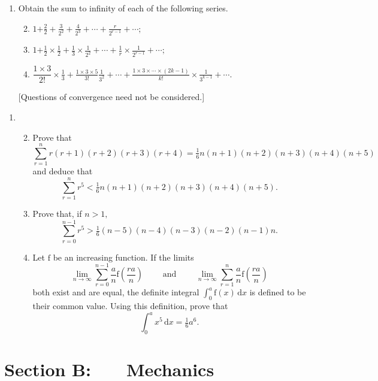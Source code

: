 \documentclass[a4, 11pt]{report}
\newlength{\qspace}
\newcounter{qnumber}
\newenvironment{question}%
 {\vspace{\qspace}
  \begin{enumerate}[\bfseries 1\quad][10]%
    \setcounter{enumi}{\value{qnumber}}%
    \item%
 }
{
  \end{enumerate}
  \filbreak
  \stepcounter{qnumber}
 }
\newenvironment{questionparts}[1][1]%
 {
  \begin{enumerate}[\bfseries (i)]%
    \setcounter{enumii}{#1}
    \addtocounter{enumii}{-1}
    \setlength{\itemsep}{5mm}
    \setlength{\parskip}{8pt}
 }
 {
  \end{enumerate}
 }
\begin{document}
		
		\begin{question}
Obtain the sum to infinity of each of the following series. 

\begin{questionparts}
\item $1{\displaystyle +\frac{2}{2}+\frac{3}{2^{2}}+\frac{4}{2^{3}}+\cdots+\frac{r}{2^{r-1}}+\cdots;}$
\item $1{\displaystyle +\frac{1}{2}\times\frac{1}{2}+\frac{1}{3}\times\frac{1}{2^{2}}+\cdots+\frac{1}{r}\times\frac{1}{2^{r-1}}+\cdots;}$
\item ${\displaystyle \dfrac{1\times3}{2!}\times\frac{1}{3}+\frac{1\times3\times5}{3!}\frac{1}{3^{2}}+\cdots+\frac{1\times3\times\cdots\times(2k-1)}{k!}\times\frac{1}{3^{k-1}}+\cdots.}$
\end{questionparts}

[Questions of convergence need not be considered.]
		\end{question}
		
	
\begin{question}
\begin{questionparts}
	 \item Prove that 
\[
\sum_{r=1}^{n}r(r+1)(r+2)(r+3)(r+4)=\tfrac{1}{6}n(n+1)(n+2)(n+3)(n+4)(n+5)
\]
and deduce that 
\[
\sum_{r=1}^{n}r^{5}<\tfrac{1}{6}n(n+1)(n+2)(n+3)(n+4)(n+5).
\]
\item Prove that, if $n>1,$ 
\[
\sum_{r=0}^{n-1}r^{5}>\tfrac{1}{6}(n-5)(n-4)(n-3)(n-2)(n-1)n.
\]
\item Let $\mathrm{f}$ be an increasing function. If the limits
\[
\lim_{n\rightarrow\infty}\sum_{r=0}^{n-1}\frac{a}{n}\mathrm{f}\left(\frac{ra}{n}\right)\qquad\mbox{ and }\qquad\lim_{n\rightarrow\infty}\sum_{r=1}^{n}\frac{a}{n}\mathrm{f}\left(\frac{ra}{n}\right)
\]
both exist and are equal, the definite integral ${\displaystyle \int_{0}^{a}\mathrm{f}(x)\,\mathrm{d}x}$
is defined to be their common value. Using this definition, prove
that 
\[
\int_{0}^{a}x^{5}\,\mathrm{d}x=\tfrac{1}{6}a^6.
\]
\end{questionparts}
\end{question}
			
		
		
		
	
\newpage
\section*{Section B: \ \ \ Mechanics}
\end{document}

